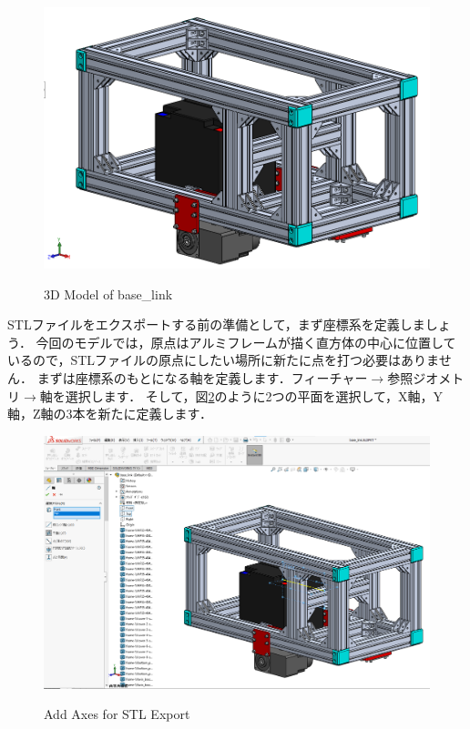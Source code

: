 \documentclass[{../../master}]{subfiles}
\begin{document}
\begin{figure}[ht]
  \centering
  \includegraphics[width=100truemm, clip]{images/base_link_cad_model.png}
  \label{fig:base_link_cad_model}
  \caption{3D Model of \textsf{base\_link}}
\end{figure}

STLファイルをエクスポートする前の準備として，まず座標系を定義しましょう．
今回のモデルでは，原点はアルミフレームが描く直方体の中心に位置しているので，STLファイルの原点にしたい場所に新たに点を打つ必要はありません．
まずは座標系のもとになる軸を定義します．フィーチャー$\rightarrow$参照ジオメトリ$\rightarrow$軸を選択します．
そして，図\ref{fig:base_link_create_axes}のように2つの平面を選択して，X軸，Y軸，Z軸の3本を新たに定義します．

\begin{figure}[ht]
  \centering
  \includegraphics[width=100truemm, clip]{images/base_link_create_axes.png}
  \label{fig:base_link_create_axes}
  \caption{Add Axes for STL Export}
\end{figure}
\end{document}
